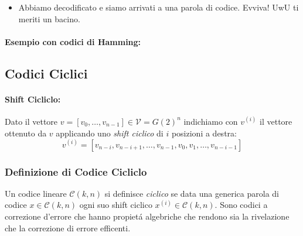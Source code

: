 \begin{enumerate}
{\begin{itemize}
{\begin{gather}
                                \begin{bmatrix}
                                1 & 1 & 0 \\ 
                                0 & 1 & 1 \\ 
                                1 & 0 & 1 \\ 
                                1 & 0 & 0 \\
                                0 & 1 & 0 \\
                                0 & 0 & 1 
                                \end{bmatrix} =
                                    \begin{bmatrix}
                                    0 & 0 & 0 
                                    \end{bmatrix}\nonumber   
                    \end{gather}
                        }
                        \item {Abbiamo decodificato e siamo arrivati a una parola di codice. Evviva! UwU ti meriti un bacino.}
                    \end{itemize}
                }
            \end{enumerate}
            \paragraph{Esempio con codici di Hamming:} 

    \subsection{Codici Ciclici}
        \paragraph{Shift Cicliclo:}\label{shift ciclico}
        \begin{sloppypar}
            Dato il vettore ${v = [v_0,\dots,v_{n-1}]\in \mathcal{V} = G(2)^n}$ indichiamo con $v^{(i)}$ il vettore ottenuto da $v$ applicando uno 
            \emph{shift ciclico} di $i$ posizioni a destra:
            \[
                v^{(i)} = [v_{n-i},v_{n-i+1}, \dots, v_{n-1},v_0,v_1,\dots, v_{n-i-1}]    
            \]     
        \end{sloppypar}
        \subsubsection{Definizione di Codice Cicliclo}
            Un codice lineare $\mathcal{C}(k,n)$ si definisce \emph{ciclico} se data una generica parola di codice $x\in \mathcal{C}(k,n)$ ogni suo
            shift ciclico $x^{(i)}\in \mathcal{C}(k,n)$. Sono codici a correzione d'errore che hanno propietá algebriche che rendono sia la rivelazione che la correzione
            di errore efficenti.
